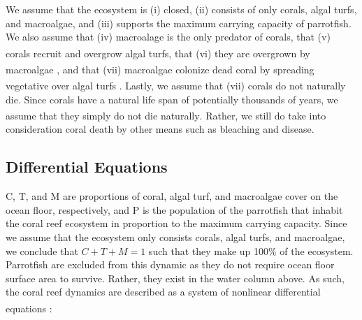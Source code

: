 \documentclass[12pt]{article}
\begin{document}
We assume that the ecosystem is  (i) closed, (ii) consists of only corals, algal turfs, and macroalgae, and (iii) supports the maximum carrying capacity of parrotfish. We also assume that (iv) macroalage is the only predator of corals, that (v) corals recruit and overgrow algal turfs\textsuperscript{\cite{04_mathanalysis}}, that (vi) they are overgrown by macroalgae \textsuperscript{\cite{04_mathanalysis}}, and that (vii) macroalgae colonize dead coral by spreading vegetative over algal turfs \textsuperscript{\cite{04_mathanalysis}}. Lastly, we assume that (vii) corals do not naturally die. Since corals have a natural life span of potentially thousands of years, we assume that they simply do not die naturally\textsuperscript{\cite{bentlage_2021}}. Rather, we still do take into consideration coral death by other means such as bleaching and disease. 


\subsection{Differential Equations}
C, T, and M are proportions of coral, algal turf, and macroalgae cover on the ocean floor, respectively, and P is the population of the parrotfish that inhabit the coral reef ecosystem in proportion to the maximum carrying capacity. Since we assume that the ecosystem only consists corals, algal turfs, and macroalgae, we conclude that $C+T+M=1$ such that they make up 100\% of the ecosystem. Parrotfish are excluded from this dynamic as they do not require ocean floor surface area to survive. Rather, they exist in the water column above. As such, the coral reef dynamics are described as a system of nonlinear differential equations \textsuperscript{\cite{13_blackwood_hastings_mumby_2010}}: 
\end{document}
